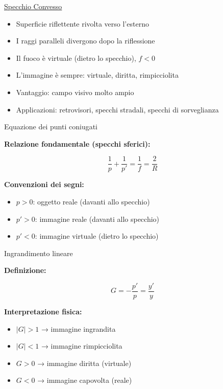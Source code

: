 
\begin{frame}{\href{https://bhuiyanek.github.io/Fisica/riflessione.html?mode=convesso}{Specchio Convesso}}
    \begin{itemize}
        \item Superficie riflettente rivolta verso l'esterno
        \item I raggi paralleli divergono dopo la riflessione
        \item Il fuoco è virtuale (dietro lo specchio), $f < 0$
        \item L'immagine è sempre: virtuale, diritta, rimpicciolita
        \item Vantaggio: campo visivo molto ampio
        \item Applicazioni: retrovisori, specchi stradali, specchi di sorveglianza
    \end{itemize}
\end{frame}

\begin{frame}{Equazione dei punti coniugati}

    \textbf{Relazione fondamentale (specchi sferici):}
    
    \medskip
    
    \[
    \frac{1}{p} + \frac{1}{p'} = \frac{1}{f} = \frac{2}{R}
    \]
    
    \medskip
    
    \textbf{Convenzioni dei segni:}
    
    \begin{itemize}
        \item $p > 0$: oggetto reale (davanti allo specchio)
        \item $p' > 0$: immagine reale (davanti allo specchio)
        \item $p' < 0$: immagine virtuale (dietro lo specchio)
    \end{itemize}

\end{frame}

\begin{frame}{Ingrandimento lineare}

    \textbf{Definizione:}
    
    \medskip
    
    \[
    G = -\frac{p'}{p} = \frac{y'}{y}
    \]
    
    \medskip
    
    \textbf{Interpretazione fisica:}
    
    \begin{itemize}
        \item $|G| > 1$ → immagine ingrandita
        \item $|G| < 1$ → immagine rimpicciolita
        \item $G > 0$ → immagine diritta (virtuale)
        \item $G < 0$ → immagine capovolta (reale)
    \end{itemize}

\end{frame}